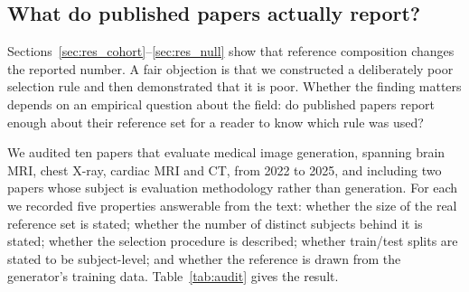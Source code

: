 \subsection{What do published papers actually report?}
\label{sec:res_audit}

Sections~\ref{sec:res_cohort}--\ref{sec:res_null} show that reference
composition changes the reported number. A fair objection is that we
constructed a deliberately poor selection rule and then demonstrated that it is
poor. Whether the finding matters depends on an empirical question about the
field: do published papers report enough about their reference set for a reader
to know which rule was used?

We audited ten papers that evaluate medical image generation, spanning brain
MRI, chest X-ray, cardiac MRI and CT, from 2022 to 2025, and including two
papers whose subject is evaluation methodology rather than generation. For each
we recorded five properties answerable from the text: whether the size of the
real reference set is stated; whether the number of distinct subjects behind it
is stated; whether the selection procedure is described; whether train/test
splits are stated to be subject-level; and whether the reference is drawn from
the generator's training data. Table~\ref{tab:audit} gives the result.

